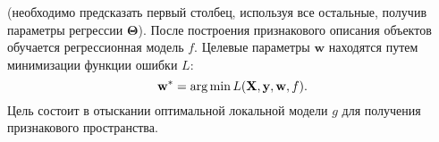 \documentclass[12pt,twoside]{article}
\begin{document}
(необходимо предсказать первый столбец, используя все остальные, получив параметры регрессии $\mathbf{\Theta}$).
После построения признакового описания объектов обучается регрессионная модель $f$. Целевые параметры $\mathbf{w}$ находятся путем минимизации функции ошибки $L$:
\begin{equation}
	\mathbf{w^*} = \argmin L(\mathbf{X}, \mathbf{y}, \mathbf{w}, f).
\end{equation}
Цель состоит в отыскании оптимальной локальной модели $g$ для получения признакового пространства.


\end{document}
